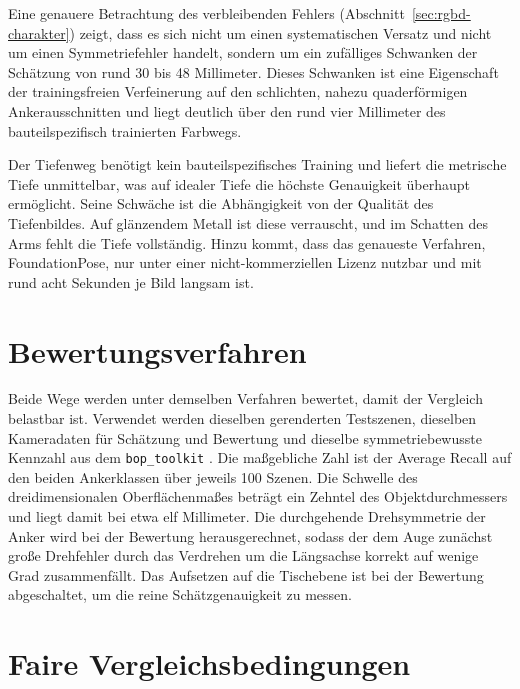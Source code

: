 \documentclass[oneside,studentpaper]{wbk}
\begin{document}
Eine genauere Betrachtung des verbleibenden Fehlers
(Abschnitt~\ref{sec:rgbd-charakter}) zeigt, dass es sich nicht um einen
systematischen Versatz und nicht um einen Symmetriefehler handelt, sondern um ein
zufälliges Schwanken der Schätzung von rund 30 bis 48 Millimeter. Dieses Schwanken
ist eine Eigenschaft der trainingsfreien Verfeinerung auf den schlichten, nahezu
quaderförmigen Ankerausschnitten und liegt deutlich über den rund vier Millimeter
des bauteilspezifisch trainierten Farbwegs.

Der Tiefenweg benötigt kein bauteilspezifisches Training und liefert die
metrische Tiefe unmittelbar, was auf idealer Tiefe die höchste Genauigkeit
überhaupt ermöglicht. Seine Schwäche ist die Abhängigkeit von der Qualität des
Tiefenbildes. Auf glänzendem Metall ist diese verrauscht, und im Schatten des
Arms fehlt die Tiefe vollständig. Hinzu kommt, dass das genaueste Verfahren,
FoundationPose, nur unter einer nicht-kommerziellen Lizenz nutzbar und mit rund
acht Sekunden je Bild langsam ist.

\section{Bewertungsverfahren}
\label{sec:evalmethodik}

Beide Wege werden unter demselben Verfahren bewertet, damit der Vergleich
belastbar ist. Verwendet werden dieselben gerenderten Testszenen, dieselben
Kameradaten für Schätzung und Bewertung und dieselbe symmetriebewusste Kennzahl
aus dem \texttt{bop\_toolkit} \cite{boptoolkit}. Die maßgebliche Zahl ist der
Average Recall auf den beiden Ankerklassen über jeweils 100 Szenen. Die Schwelle
des dreidimensionalen Oberflächenmaßes beträgt ein Zehntel des Objektdurchmessers
und liegt damit bei etwa elf Millimeter. Die durchgehende Drehsymmetrie der Anker
wird bei der Bewertung herausgerechnet, sodass der dem Auge zunächst große
Drehfehler durch das Verdrehen um die Längsachse korrekt auf wenige Grad
zusammenfällt. Das Aufsetzen auf die Tischebene ist bei der Bewertung
abgeschaltet, um die reine Schätzgenauigkeit zu messen.

\section{Faire Vergleichsbedingungen}
\label{sec:fairness}
\end{document}
